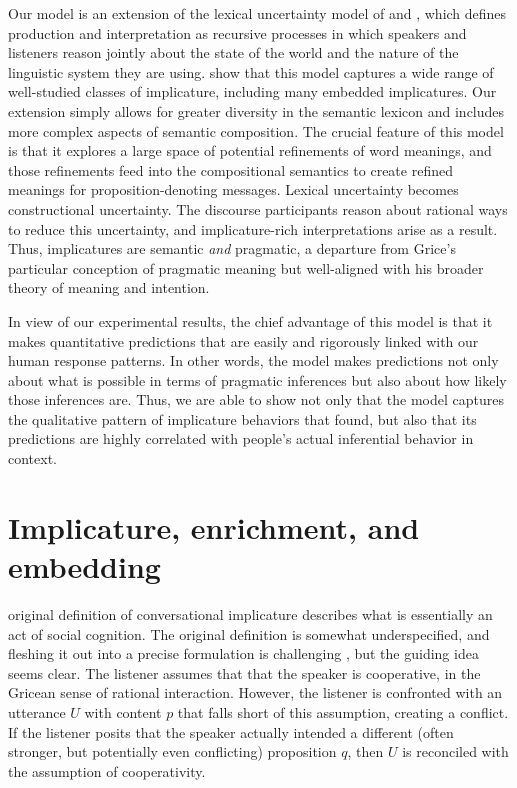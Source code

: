 \documentclass[leqno]{article}
\begin{document}
Our model is an extension of the lexical uncertainty model of
\citet{Bergen:Goodman:Levy:2012} and \citet{Bergen:Levy:Goodman:2014},
which defines production and interpretation as recursive processes in
which speakers and listeners reason jointly about the state of the
world and the nature of the linguistic system they are
using. \citeauthor{Bergen:Levy:Goodman:2014} show that this model
captures a wide range of well-studied classes of implicature,
including many embedded implicatures. Our extension simply allows for
greater diversity in the semantic lexicon and includes more complex
aspects of semantic composition.  The crucial feature of this model is
that it explores a large space of potential refinements of word
meanings, and those refinements feed into the compositional semantics
to create refined meanings for proposition-denoting messages. Lexical
uncertainty becomes constructional uncertainty. The discourse
participants reason about rational ways to reduce this uncertainty,
and implicature-rich interpretations arise as a result. Thus,
implicatures are semantic \emph{and} pragmatic, a departure from
Grice's particular conception of pragmatic meaning but well-aligned
with his broader theory of meaning and intention.

In view of our experimental results, the chief advantage of this model
is that it makes quantitative predictions that are easily and
rigorously linked with our human response patterns. In other words,
the model makes predictions not only about what is possible in terms
of pragmatic inferences but also about how likely those inferences
are. Thus, we are able to show not only that the model captures the
qualitative pattern of implicature behaviors that
\citeauthor{Chemla:Spector:2011} found, but also that its predictions
are highly correlated with people's actual inferential behavior in
context.


\section{Implicature, enrichment, and embedding }\label{sec:implicature}

 original definition of conversational implicature
describes what is essentially an act of social cognition. The original
definition is somewhat underspecified, and fleshing it out into a
precise formulation is challenging \citep{Hirschberg85}, but the
guiding idea seems clear.  The listener assumes that that the speaker
is cooperative, in the Gricean sense of rational interaction. However,
the listener is confronted with an utterance $U$ with content $p$ that
falls short of this assumption, creating a conflict. If the listener
posits that the speaker actually intended a different (often stronger,
but potentially even conflicting) proposition $q$, then $U$ is
reconciled with the assumption of cooperativity.
\end{document}
